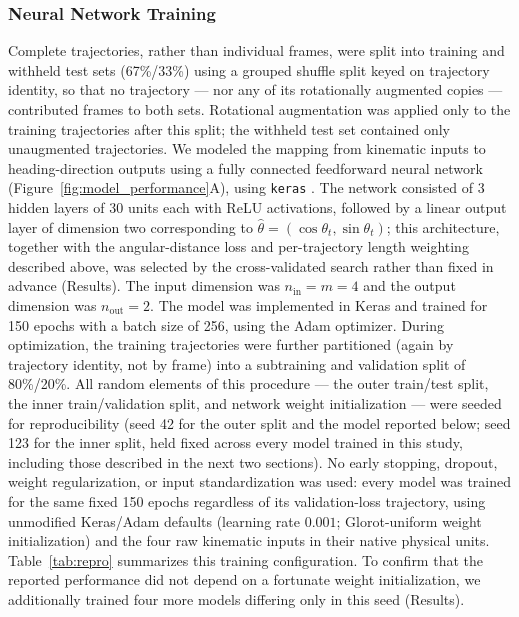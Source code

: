 \documentclass[11pt]{article}
\begin{document}
\subsubsection*{Neural Network Training}
Complete trajectories, rather than individual frames, were split into training and withheld test sets (67\%/33\%) using a grouped shuffle split keyed on trajectory identity, so that no trajectory --- nor any of its rotationally augmented copies --- contributed frames to both sets. Rotational augmentation was applied only to the training trajectories after this split; the withheld test set contained only unaugmented trajectories. We modeled the mapping from kinematic inputs to heading-direction outputs using a fully connected feedforward neural network (Figure~\ref{fig:model_performance}A), using \texttt{keras} \citep{chollet2015keras}. The network consisted of 3 hidden layers of 30 units each with ReLU activations, followed by a linear output layer of dimension two corresponding to $\hat{\theta}=(\cos\theta_t,\sin\theta_t)$; this architecture, together with the angular-distance loss and per-trajectory length weighting described above, was selected by the cross-validated search rather than fixed in advance (Results). The input dimension was $n_{\text{in}} = m = 4$ and the output dimension was $n_{\text{out}} = 2$. The model was implemented in Keras and trained for 150 epochs with a batch size of 256, using the Adam optimizer. During optimization, the training trajectories were further partitioned (again by trajectory identity, not by frame) into a subtraining and validation split of 80\%/20\%. All random elements of this procedure --- the outer train/test split, the inner train/validation split, and network weight initialization --- were seeded for reproducibility (seed 42 for the outer split and the model reported below; seed 123 for the inner split, held fixed across every model trained in this study, including those described in the next two sections). No early stopping, dropout, weight regularization, or input standardization was used: every model was trained for the same fixed 150 epochs regardless of its validation-loss trajectory, using unmodified Keras/Adam defaults (learning rate $0.001$; Glorot-uniform weight initialization) and the four raw kinematic inputs in their native physical units. Table~\ref{tab:repro} summarizes this training configuration. To confirm that the reported performance did not depend on a fortunate weight initialization, we additionally trained four more models differing only in this seed (Results).
\end{document}
